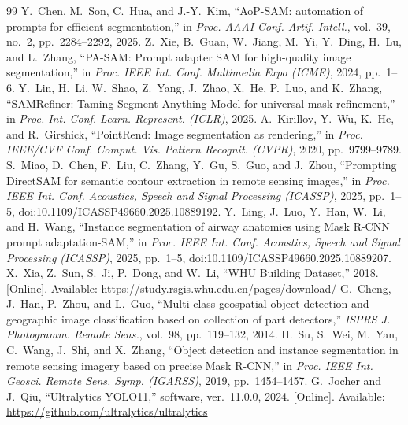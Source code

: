 \documentclass{article}
\begin{document}
\begin{thebibliography}{99}
 Y.~Chen, M.~Son, C.~Hua, and J.-Y.~Kim, ``AoP-SAM: automation of prompts for efficient segmentation,'' in \textit{Proc. AAAI Conf. Artif. Intell.}, vol.~39, no.~2, pp.~2284--2292, 2025.
 Z.~Xie, B.~Guan, W.~Jiang, M.~Yi, Y.~Ding, H.~Lu, and L.~Zhang, ``PA-SAM: Prompt adapter SAM for high-quality image segmentation,'' in \textit{Proc. IEEE Int. Conf. Multimedia Expo (ICME)}, 2024, pp.~1--6.
 Y.~Lin, H.~Li, W.~Shao, Z.~Yang, J.~Zhao, X.~He, P.~Luo, and K.~Zhang, ``SAMRefiner: Taming Segment Anything Model for universal mask refinement,'' in \textit{Proc. Int. Conf. Learn. Represent. (ICLR)}, 2025.
 A.~Kirillov, Y.~Wu, K.~He, and R.~Girshick, ``PointRend: Image segmentation as rendering,'' in \textit{Proc. IEEE/CVF Conf. Comput. Vis. Pattern Recognit. (CVPR)}, 2020, pp.~9799--9789.
 S.~Miao, D.~Chen, F.~Liu, C.~Zhang, Y.~Gu, S.~Guo, and J.~Zhou, ``Prompting DirectSAM for semantic contour extraction in remote sensing images,'' in \textit{Proc. IEEE Int. Conf. Acoustics, Speech and Signal Processing (ICASSP)}, 2025, pp.~1--5, doi:10.1109/ICASSP49660.2025.10889192.
 Y.~Ling, J.~Luo, Y.~Han, W.~Li, and H.~Wang, ``Instance segmentation of airway anatomies using Mask R-CNN prompt adaptation-SAM,'' in \textit{Proc. IEEE Int. Conf. Acoustics, Speech and Signal Processing (ICASSP)}, 2025, pp.~1--5, doi:10.1109/ICASSP49660.2025.10889207.
 X.~Xia, Z.~Sun, S.~Ji, P.~Dong, and W.~Li, ``WHU Building Dataset,'' 2018. [Online]. Available: \url{https://study.rsgis.whu.edu.cn/pages/download/}
 G.~Cheng, J.~Han, P.~Zhou, and L.~Guo, ``Multi-class geospatial object detection and geographic image classification based on collection of part detectors,'' \textit{ISPRS J. Photogramm. Remote Sens.}, vol.~98, pp.~119--132, 2014.
 H.~Su, S.~Wei, M.~Yan, C.~Wang, J.~Shi, and X.~Zhang, ``Object detection and instance segmentation in remote sensing imagery based on precise Mask R-CNN,'' in \textit{Proc. IEEE Int. Geosci. Remote Sens. Symp. (IGARSS)}, 2019, pp.~1454--1457.
 G.~Jocher and J.~Qiu, ``Ultralytics YOLO11,'' software, ver.~11.0.0, 2024. [Online]. Available: \url{https://github.com/ultralytics/ultralytics}
\end{thebibliography}
\end{document}

